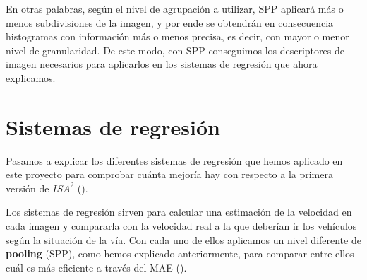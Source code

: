 En otras palabras, según el nivel de agrupación a utilizar, \ac{SPP} aplicará más o menos subdivisiones de la imagen, y por ende se obtendrán en consecuencia histogramas con información más o menos precisa, es decir, con mayor o menor nivel de granularidad. De este modo, con \ac{SPP} conseguimos los descriptores de imagen necesarios para aplicarlos en los sistemas de regresión que ahora explicamos.




\section{Sistemas de regresión}

Pasamos a explicar los diferentes sistemas de regresión que hemos aplicado en este proyecto para comprobar cuánta mejoría hay con respecto a la primera versión de $ISA^{2}$ (\cite{isa2}).

Los sistemas de regresión sirven para calcular una estimación de la velocidad en cada imagen y compararla con la velocidad real a la que deberían ir los vehículos según la situación de la vía. Con cada uno de ellos aplicamos un nivel diferente de \textbf{pooling} (\ac{SPP}), como hemos explicado anteriormente, para comparar entre ellos cuál es más eficiente a través del \ac{MAE} (\cite{mae}).
 
